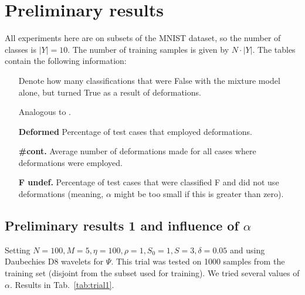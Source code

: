 \documentclass{article}
\begin{document}
\section{Preliminary results}
All experiments here are on subsets of the MNIST dataset, so the number of classes is $|Y| = 10$. The number of training samples is given by $N \cdot |Y|$. The tables contain the following information:
\begin{itemize}
    \item[\textbf{\FT}] Denote how many classifications that were False with the mixture model alone, but turned True as a result of deformations.
    \item[\textbf{\TF}] Analogous to \FT.
    \item[\textbf{Deformed}] Percentage of test cases that employed deformations. 
    \item[\textbf{\#cont.}] Average number of deformations made for all cases where deformations were employed.
    \item[\textbf{F undef.}] Percentage of test cases that were classified F and did not use deformations (meaning, $\alpha$ might be too small if this is greater than zero).
\end{itemize}

\subsection{Preliminary results 1 and influence of $\alpha$}
Setting $N=100, M=5, \eta=100, \rho=1, S_0=1, S=3, \delta=0.05$ and using Daubechies D8 wavelets for $\Psi$. This trial was tested on 1000 samples from the training set (disjoint from the subset used for training). We tried several values of $\alpha$. Results in Tab.~\ref{tab:trial1}.
\end{document}
